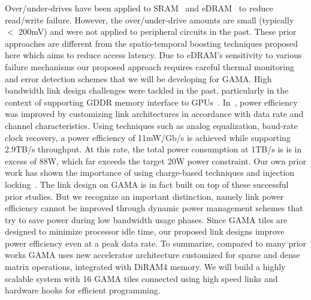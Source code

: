 Over/under-drives have been applied to SRAM~\cite{7046972, 6176988} and eDRAM~\cite{6757412} to reduce read/write failure. However, the over/under-drive amounts are small (typically $<$ 200mV) and were not applied to  peripheral circuits in the past. These prior approaches are different from the spatio-temporal boosting techniques proposed here which aims to reduce access latency. Due to eDRAM's sensitivity to various failure mechanisms our proposed approach requires careful thermal monitoring and error detection schemes that we will be developing for GAMA. High bandwidth link design challenges were tackled in the past, particularly in the context of supporting GDDR memory interface to GPUs~\cite{partovi2009single, kho201075}. In~\cite{krishnaswamy2013bandwidth}, power efficiency was improved by customizing link architectures in accordance with data rate and channel characteristics. Using techniques such as analog equalization, baud-rate clock recovery, a power efficiency of 11mW/Gb/s is achieved while supporting 2.9TB/s throughput. At this rate, the total power consumption at 1TB/s is is in excess of 88W, which far exceeds the target 20W power constraint. Our own prior work has shown the importance of using charge-based techniques and injection locking~\cite{saxena20152, elkholy201610}. The link design on GAMA is in fact built on top of these successful prior studies. But we recognize an important distinction, namely link power efficiency cannot be improved through dynamic power management schemes that try to save power during low bandwidth usage phases.   Since GAMA tiles are designed to minimize processor idle time,  our proposed link designs improve power efficiency even at a peak data rate. To summarize, compared to many prior works  GAMA uses  new accelerator architecture customized for sparse and dense  matrix operations,  integrated with DiRAM4 memory. We will build a highly scalable system with 16 GAMA tiles connected using high speed links and hardware hooks for efficient programming.  



\begin{comment}
Various spatio-temporal voltage boosting techniques have been applied to SRAM to reduce read/write failure of SRAM arrays at low voltage~\cite{}, 
while the failure mechanism of eDRAM arrays singificantly differs from that of SRAM arrays.
That is, such voltage boosting techniques have never been applied to eDRAM arrays especially to reduce the access latency.
\end{comment}


